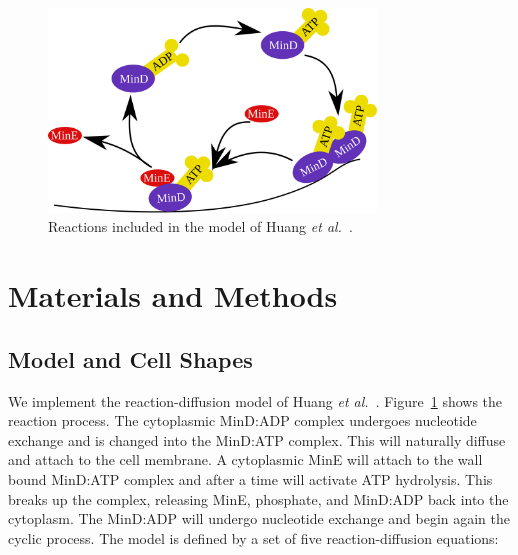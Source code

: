 \documentclass[10pt,letterpaper]{article}
\begin{document}
\begin{figure}
  \includegraphics[width=8.7cm]{reactions}
  \caption{Reactions included in the model of Huang \emph{et
      al.}~\cite{huang2003dynamic}.}\label{fig:reactions}
\end{figure}


\section*{Materials and Methods}
\subsection*{Model and Cell Shapes}
\label{sec:model-method-shapes}
We implement the reaction-diffusion model of Huang \emph{et
  al.}~\cite{huang2003dynamic}.  Figure~\ref{fig:reactions} shows the
reaction process.  The cytoplasmic MinD:ADP complex undergoes
nucleotide exchange and is changed into the MinD:ATP complex.  This
will naturally diffuse and attach to the cell membrane.  A cytoplasmic
MinE will attach to the wall bound MinD:ATP complex and after a time
will activate ATP hydrolysis.  This breaks up the complex, releasing
MinE, phosphate, and MinD:ADP back into the cytoplasm.  The MinD:ADP
will undergo nucleotide exchange and begin again the cyclic process.
The model is defined by a set of five reaction-diffusion equations:
\end{document}
